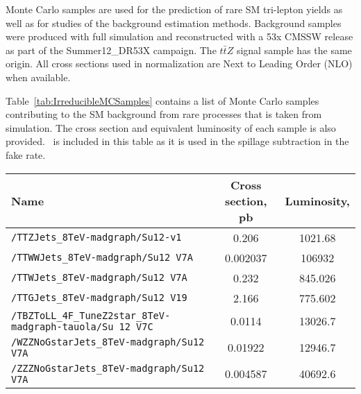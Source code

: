 Monte Carlo samples are used for the prediction of rare SM tri-lepton yields as well as for studies of the background estimation methods.  
Background samples were produced with full simulation and reconstructed with a 53x CMSSW release as part of the Summer12\_DR53X campaign.
The $t\bar{t}Z$ signal sample has the same origin.    
All cross sections used in normalization are Next to Leading Order (NLO) when available.

Table~\ref{tab:IrreducibleMCSamples} contains a list of Monte Carlo samples contributing to the SM background from rare processes that is taken from simulation.  The cross section and equivalent luminosity of each sample is also provided. \ttZ \ is included in this table as it is used in the spillage subtraction in the fake rate.

\begin{sidewaystable}[H]
\begin{center}
\begin{tabular}{lcc}
\hline\hline
Name														           & Cross section, pb & Luminosity, \fbinv \\ \hline
\verb=/TTZJets_8TeV-madgraph/Su12-v1=                                                                 & 0.206                     &       1021.68         \\ 
\verb=/TTWWJets_8TeV-madgraph/Su12 V7A=                                                            & 0.002037          &      106932       \\ 
\verb=/TTWJets_8TeV-madgraph/Su12 V7A=                                                               & 0.232             &        845.026         \\ 
\verb=/TTGJets_8TeV-madgraph/Su12 V19=                                                                & 2.166             &       775.602          \\ 
\verb=/TBZToLL_4F_TuneZ2star_8TeV-madgraph-tauola/Su 12 V7C=                 &  0.0114             &         13026.7        \\
\verb=/WZZNoGstarJets_8TeV-madgraph/Su12 V7A=                                               & 0.01922           &       12946.7        \\ 
\verb=/ZZZNoGstarJets_8TeV-madgraph/Su12 V7A=                                                 & 0.004587          &     40692.6          \\ 
\hline\hline
\end{tabular}
\caption{\label{tab:IrreducibleMCSamples} MC datasets corresponding to contributions not covered by the data-driven methods.
Predicted yields from the SM samples listed here are used directly in the analysis. 
The common part of each dataset name {\tt Summer12\_DR53X-PU\_S10\_START53\_V7X-v1} is replaced with a shorthand {\tt Su12 V7X}. 
All datasets are in the AODSIM data tier.}
\end{center}
\end{sidewaystable}

